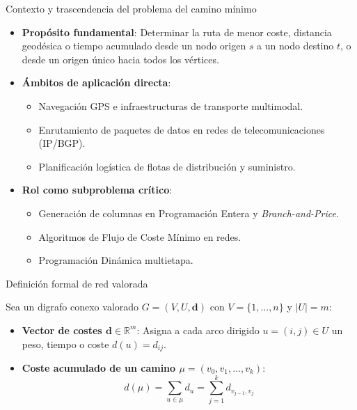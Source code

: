 \documentclass[
  ignorenonframetext,
]{beamer}
\providecommand{\tightlist}{%
  \setlength{\itemsep}{0pt}\setlength{\parskip}{0pt}}
\begin{document}
\begin{frame}{Contexto y trascendencia del problema del camino mínimo}
\label{contexto-y-trascendencia-del-problema-del-camino-muxednimo}
\begin{itemize}
\item
  \textbf{Propósito fundamental}: Determinar la ruta de menor coste,
  distancia geodésica o tiempo acumulado desde un nodo origen \(s\) a un
  nodo destino \(t\), o desde un origen único hacia todos los vértices.
\item
  \textbf{Ámbitos de aplicación directa}:

  \begin{itemize}
  \tightlist
  \item
    Navegación GPS e infraestructuras de transporte multimodal.
  \item
    Enrutamiento de paquetes de datos en redes de telecomunicaciones
    (IP/BGP).
  \item
    Planificación logística de flotas de distribución y suministro.
  \end{itemize}
\item
  \textbf{Rol como subproblema crítico}:

  \begin{itemize}
  \tightlist
  \item
    Generación de columnas en Programación Entera y
    \emph{Branch-and-Price}.
  \item
    Algoritmos de Flujo de Coste Mínimo en redes.
  \item
    Programación Dinámica multietapa.
  \end{itemize}
\end{itemize}
\end{frame}

\begin{frame}{Definición formal de red valorada}
\label{definiciuxf3n-formal-de-red-valorada}
\begin{tcolorbox}[enhanced jigsaw, colframe=quarto-callout-note-color-frame, toptitle=1mm, colback=white, colbacktitle=quarto-callout-note-color!10!white, titlerule=0mm, breakable, coltitle=black, opacityback=0, bottomrule=.15mm, title=\textcolor{quarto-callout-note-color}{\faInfo}\hspace{0.5em}{Red valorada y coste acumulado de un camino}, rightrule=.15mm, arc=.35mm, leftrule=.75mm, left=2mm, toprule=.15mm, bottomtitle=1mm, opacitybacktitle=0.6]

Sea un digrafo conexo valorado \(G = (V, U, \mathbf{d})\) con
\(V = \{1, \dots, n\}\) y \(|U| = m\):

\begin{itemize}
\item
  \textbf{Vector de costes \(\mathbf{d} \in \mathbb{R}^m\)}: Asigna a
  cada arco dirigido \(u = (i, j) \in U\) un peso, tiempo o coste
  \(d(u) = d_{ij}\).
\item
  \textbf{Coste acumulado de un camino
  \(\mu = (v_0, v_1, \dots, v_k)\)}:
  \[d(\mu) = \sum_{u \in \mu} d_u = \sum_{j=1}^k d_{v_{j-1}, v_j}\]
\end{itemize}

\end{tcolorbox}
\end{frame}
\end{document}
